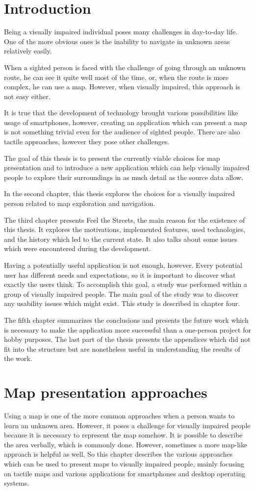 \documentclass[nolof,digital]{fithesis3}
\begin{document}
\chapter{Introduction}
Being a visually impaired individual poses many challenges in day-to-day life. One of the more obvious ones is the inability to navigate in unknown areas relatively easily.

When a sighted person is faced with the challenge of going through an unknown route, he can see it quite well most of the time, or, when the route is more complex, he can use a map. However, when visually impaired, this approach is not easy either.

It is true that the development of technology brought various possibilities like usage of smartphones, however, creating an application which can present a map is not something trivial even for the audience of sighted people. There are also tactile approaches, however they pose other challenges.

The goal of this thesis is to present the currently viable choices for map presentation and to introduce a new application which can help visually impaired people to explore their surroundings in as much detail as the source data allow.

In the second chapter, this thesis explores the choices for a visually impaired person related to map exploration and navigation.

The third chapter presents Feel the Streets, the main reason for the existence of this thesis. It explores the motivations, implemented features, used technologies, and the history which led to the current state. It also talks about some issues which were encountered during the development.

Having a potentially useful application is not enough, however. Every potential user has different needs and expectations, so it is important to discover what exactly the users think. To accomplish this goal, a study was performed within a group of visually impaired people. The main goal of the study was to discover any usability issues which might exist. This study is described in chapter four.

The fifth chapter summarizes the conclusions and presents the future work which is necessary to make the application more successful than a one-person project for hobby purposes. The last part of the thesis presents the appendices which did not fit into the structure but are nonetheless useful in understanding the results of the work.
\chapter{Map presentation approaches}
Using a map is one of the more common approaches when a person wants to learn an unknown area. However, it poses a challenge for visually impaired people because it is necessary to represent the map somehow. It is possible to describe the area verbally, which is commonly done. However, sometimes a more map-like approach is helpful as well. So this chapter describes the various approaches which can be used to present maps to visually impaired people, mainly focusing on tactile maps and various applications for smartphones and desktop operating systems.
\end{document}
